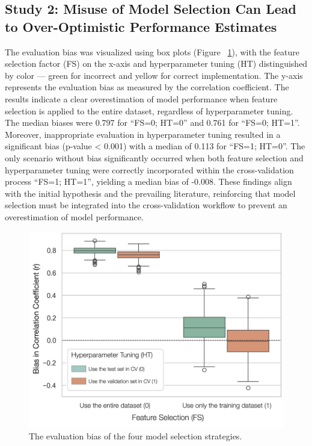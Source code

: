 \subsection{Study 2: Misuse of Model Selection Can Lead to Over-Optimistic Performance Estimates}

The evaluation bias was visualized using box plots (Figure ~\ref{fig:s2_results}), with the feature selection factor (FS) on the x-axis and hyperparameter tuning (HT) distinguished by color — green for incorrect and yellow for correct implementation. The y-axis represents the evaluation bias as measured by the correlation coefficient. The results indicate a clear overestimation of model performance when feature selection is applied to the entire dataset, regardless of hyperparameter tuning. The median biases were 0.797 for “FS=0; HT=0” and 0.761 for “FS=0; HT=1”. Moreover, inappropriate evaluation in hyperparameter tuning resulted in a significant bias (p-value < 0.001) with a median of 0.113 for “FS=1; HT=0”. The only scenario without bias significantly occurred when both feature selection and hyperparameter tuning were correctly incorporated within the cross-validation process “FS=1; HT=1”, yielding a median bias of -0.008. These findings align with the initial hypothesis and the prevailing literature, reinforcing that model selection must be integrated into the cross-validation workflow to prevent an overestimation of model performance.

\begin{figure}
    \centering
    \includegraphics[width=.7\textwidth]{fig_s2_results.jpg}
    \caption{The evaluation bias of the four model selection strategies.}
    \label{fig:s2_results}
\end{figure}

